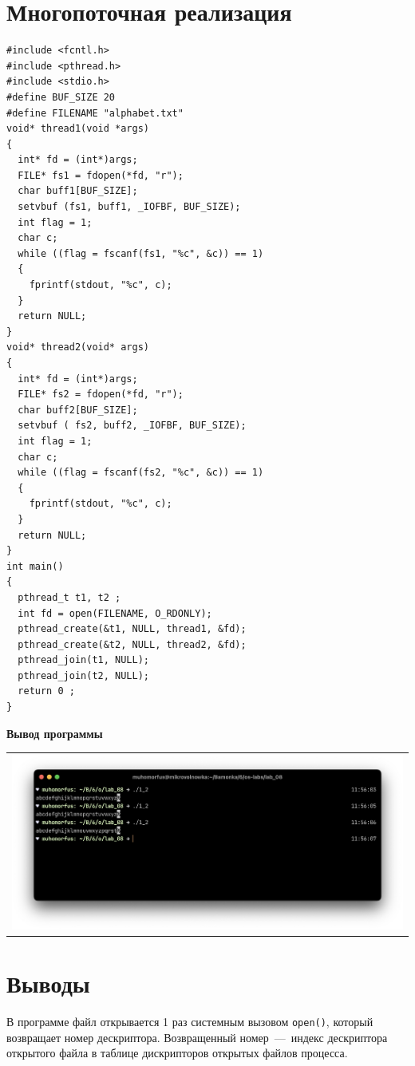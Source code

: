 \section{Многопоточная реализация}

\begin{lstlisting}
#include <fcntl.h>
#include <pthread.h>
#include <stdio.h>
#define BUF_SIZE 20
#define FILENAME "alphabet.txt"
void* thread1(void *args) 
{
  int* fd = (int*)args;
  FILE* fs1 = fdopen(*fd, "r");
  char buff1[BUF_SIZE];
  setvbuf (fs1, buff1, _IOFBF, BUF_SIZE);
  int flag = 1;
  char c;
  while ((flag = fscanf(fs1, "%c", &c)) == 1)
  {
    fprintf(stdout, "%c", c);
  }
  return NULL;
}
void* thread2(void* args) 
{
  int* fd = (int*)args;
  FILE* fs2 = fdopen(*fd, "r");
  char buff2[BUF_SIZE];
  setvbuf ( fs2, buff2, _IOFBF, BUF_SIZE);
  int flag = 1;
  char c;
  while ((flag = fscanf(fs2, "%c", &c)) == 1) 
  {
    fprintf(stdout, "%c", c);
  }
  return NULL;
}
int main() 
{
  pthread_t t1, t2 ;
  int fd = open(FILENAME, O_RDONLY);
  pthread_create(&t1, NULL, thread1, &fd);
  pthread_create(&t2, NULL, thread2, &fd);
  pthread_join(t1, NULL);
  pthread_join(t2, NULL); 
  return 0 ;
}
\end{lstlisting}

\textbf{Вывод программы}

 \begin{table}[H]
	\centering
	\begin{tabular}{p{1\linewidth}}
		\centering
		\includegraphics[width=0.9\linewidth]{./images/2.png}
	\end{tabular}
\end{table}

\section{Выводы}
В программе файл открывается 1 раз системным вызовом \texttt{open()},  который возвращает номер дескриптора. Возвращенный номер~---~индекс дескриптора открытого файла в таблице дискрипторов открытых файлов процесса.
	
